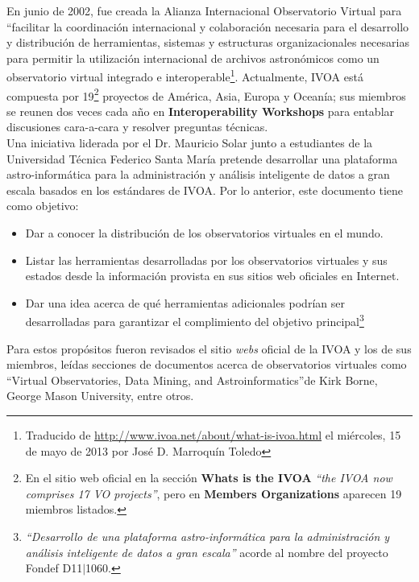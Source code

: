 \documentclass[11pt]{article}
\begin{document}
         En junio de 2002, fue creada la Alianza Internacional Observatorio
Virtual para ``facilitar la coordinaci\'{o}n internacional y colaboraci\'{o}n
necesaria para el desarrollo y distribuci\'{o}n de herramientas, sistemas y
estructuras organizacionales necesarias para permitir la utilizaci\'{o}n
internacional de archivos astron\'{o}micos como un observatorio virtual
integrado e interoperable\footnote{Traducido de
\url{http://www.ivoa.net/about/what-is-ivoa.html} el mi\'{e}rcoles, 15 de mayo
de 2013 por Jos\'{e} D. Marroqu\'{i}n Toledo}. Actualmente, IVOA est\'{a}
compuesta por 19\footnote{En el sitio web oficial en la secci\'{o}n
\textbf{Whats is the IVOA} \textit{``the IVOA now comprises 17 VO projects''},
pero en \textbf{Members Organizations} aparecen 19 miembros listados.} proyectos
de Am\'{e}rica, Asia, Europa y Ocean\'{i}a; sus miembros se reunen dos veces
cada a\~{n}o en \textbf{Interoperability Workshops} para entablar discusiones
cara-a-cara y resolver preguntas t\'{e}cnicas.\\

         Una iniciativa liderada por el Dr. Mauricio Solar junto a estudiantes
de la Universidad T\'{e}cnica Federico Santa Mar\'{i}a pretende desarrollar una
plataforma astro-inform\'{a}tica para la administraci\'{o}n y an\'{a}lisis
inteligente de datos a gran escala basados en los est\'{a}ndares de IVOA. Por lo
anterior, este documento tiene como objetivo:

         \begin{itemize}
             \item Dar a conocer la distribuci\'{o}n de los observatorios
virtuales en el mundo.
             \item Listar las herramientas desarrolladas por los observatorios
virtuales y sus estados desde la informaci\'{o}n provista en sus sitios web
oficiales en Internet.
             \item Dar una idea acerca de qu\'{e} herramientas adicionales
podr\'{i}an ser desarrolladas para garantizar el complimiento del objetivo
principal\footnote{\textit{``Desarrollo de una plataforma astro-inform\'{a}tica
para la administraci\'{o}n y an\'{a}lisis inteligente de datos a gran escala''}
acorde al nombre del proyecto Fondef D11$ \vert $1060.}
         \end{itemize}

         Para estos prop\'{o}sitos fueron revisados el sitio \textit{webs}
oficial de la IVOA y los de sus miembros, le\'{i}das secciones de documentos
acerca de observatorios virtuales como ``Virtual Observatories, Data Mining, and
Astroinformatics''de Kirk Borne, George Mason University, entre otros.\\
\end{document}
